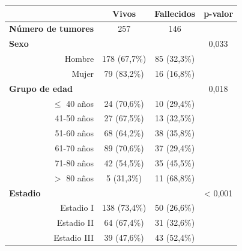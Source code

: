 \begin{table}[H]
	\centering
	\begin{tabular}{rccc}
		\cline{2-4}
		\multicolumn{1}{l}{}                              & \textbf{Vivos} & \textbf{Fallecidos} & \textbf{p-valor}     \\ \hline
		\multicolumn{1}{l}{\textbf{Número de tumores}}    & 257            & 146                 & \multicolumn{1}{l}{} \\ \hline
		\multicolumn{1}{l}{\textbf{Sexo}}                 &                &                     & 0,033                \\
		Hombre                                            & 178 (67,7\%)   & 85 (32,3\%)         &                      \\
		Mujer                                             & 79 (83,2\%)    & 16 (16,8\%)         &                      \\ \hline
		\multicolumn{1}{l}{\textbf{Grupo de edad}}        &                &                     & 0,018                \\
		$\leq$ 40 años                                         & 24 (70,6\%)    & 10 (29,4\%)         &                      \\
		41-50 años                                        & 27 (67,5\%)    & 13 (32,5\%)         &                      \\
		51-60 años                                        & 68 (64,2\%)    & 38 (35,8\%)         &                      \\
		61-70 años                                        & 89 (70,6\%)    & 37 (29,4\%)         &                      \\
		71-80 años                                        & 42 (54,5\%)    & 35 (45,5\%)         &                      \\
		$>$ 80 años                                   & 5 (31,3\%)     & 11 (68,8\%)         &                      \\ \hline
		\multicolumn{1}{l}{\textbf{Estadio}}              &                &                     & \textless{} 0,001     \\
		Estadio I                                         & 138 (73,4\%)   & 50 (26,6\%)         &                      \\
		Estadio II                                        & 64 (67,4\%)    & 31 (32,6\%)         &                      \\
		Estadio III                                       & 39 (47,6\%)    & 43 (52,4\%)         &                      \\

\end{tabular}
\end{table}
